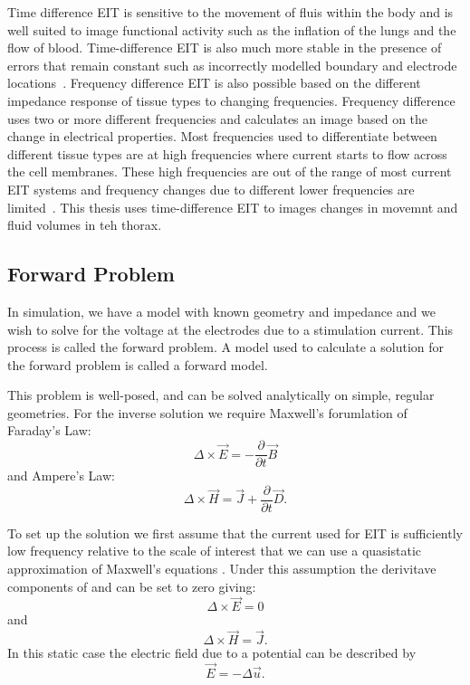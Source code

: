 Time difference EIT is sensitive to the movement of fluis within the body 
and is well suited to image functional activity such as 
the inflation of the lungs 
and the flow of blood.
Time-difference EIT is also much more stable in the presence of errors that remain 
constant such as incorrectly modelled boundary and electrode 
locations~\parencite{brown_electrical_2003,adler_electrical_2017}.
Frequency difference EIT is also possible based on the different impedance response 
of tissue types to changing frequencies. Frequency difference uses 
two or more different frequencies and calculates an image based on the change in electrical properties.
Most frequencies used to differentiate between different tissue types are at high frequencies 
where current starts to flow across the cell membranes. 
These high frequencies are out of the range of most current EIT systems and 
frequency changes due to different lower frequencies are limited~\parencite{adler_electrical_2017}.
This thesis uses time-difference EIT to images changes in movemnt and fluid volumes in teh thorax.

\subsection{Forward Problem} \label{sec:fwd}
In simulation, we have a model with known geometry and impedance and we wish to solve for the 
voltage at the electrodes due to a stimulation current. 
This process is called the forward problem. 
A model used to calculate a solution for the forward problem is called a forward 
model. 

This problem is well-posed, and can be solved analytically on simple, regular geometries. 
For the inverse solution we require Maxwell's forumlation of Faraday's Law:
\begin{equation} \label{eq:farad}
\Delta \times \vec{E} = -\frac{\partial}{\partial t} \vec{B}
\end{equation}
and Ampere's Law: 
\begin{equation} \label{eq:amp}
\Delta \times \vec{H} = \vec{J} + \frac{\partial}{\partial t} \vec{D}.
\end{equation}

To set up the solution we first assume that the current used for EIT is sufficiently low 
frequency relative to the scale of interest that we can use a 
quasistatic approximation of Maxwell's equations \parencite{larsson_electromagnetics_2007}. 
Under this assumption the derivitave components of  and 
can be set to zero giving:
\begin{equation}
\Delta \times \vec{E} = 0
\end{equation}
and
\begin{equation} \label{eq:amp2}
\Delta \times \vec{H} = \vec{J}.
\end{equation}
In this static case the electric field due to a potential can be described by 
\begin{equation} \label{eq:field}
	\vec{E} = -\Delta\vec{u}.
\end{equation}

